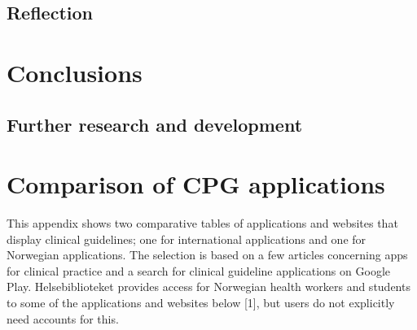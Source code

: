 \documentclass[a4paper,12pt]{book}
\begin{document}
\section{Reflection}



\chapter{Conclusions}
\section{Further research and development}


\backmatter
\printbibliography


\appendix
\chapter{Comparison of CPG applications}\label{appendix:ComparisonApps}
This appendix shows two comparative tables of applications and websites that display clinical guidelines; one for international applications and one for Norwegian applications. The selection is based on a few articles concerning apps for clinical practice and a search for clinical guideline applications on Google Play.
Helsebiblioteket provides access for Norwegian health workers and students to some of the applications and websites below [1], but users do not explicitly need accounts for this.

\end{document}
